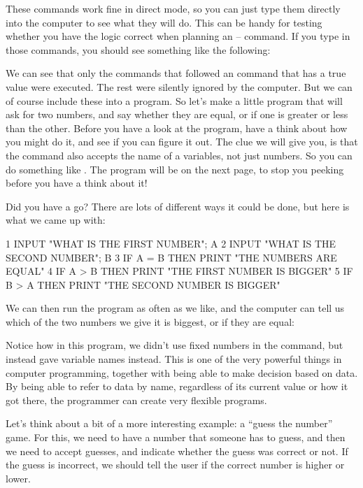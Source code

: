 \needspace{4cm}
These commands work fine in direct mode, so you can just type them
directly into the computer to see what they will do.  This can be
handy for testing whether you have the logic correct when planning an
 --  command.  If you type in those commands, you
should see something like the following:


We can see that only the  commands that followed an
 command that has a true value were executed. The rest
were silently ignored by the computer.  But we can of course include
these into a program. So let's make a little program that will ask
for two numbers, and say whether they are equal, or if one is greater
or less than the other.  Before you have a look at the program, have
a think about how you might do it, and see if you can figure it out.
The clue we will give you, is that the  command also accepts the name of
a variables, not just numbers. So you can do something like . The program will be on the next page, to stop you peeking before you
have a think about it!

\pagebreak

Did you have a go?  There are lots of different ways it could be done,
but here is what we came up with:

\begin{screencode}
1 INPUT "WHAT IS THE FIRST NUMBER"; A
2 INPUT "WHAT IS THE SECOND NUMBER"; B
3 IF A = B THEN PRINT "THE NUMBERS ARE EQUAL"
4 IF A > B THEN PRINT "THE FIRST NUMBER IS BIGGER"
5 IF B > A THEN PRINT "THE SECOND NUMBER IS BIGGER"
\end{screencode}

We can then run the program as often as we like, and the computer
can tell us which of the two numbers we give it is biggest, or if they
are equal:


Notice how in this program, we didn't use fixed numbers in the
 command, but instead gave variable names instead.  This is
one of the very powerful things in computer programming, together
with being able to make decision based on data. By being able to refer
to data by name, regardless of its current value or how it got there,
the programmer can create very flexible programs.

Let's think about a bit of a more interesting example: a ``guess the
number'' game.
For this, we need to have a number that someone has to guess, and then
we need to accept guesses, and indicate whether the guess was correct
or not. If the guess is incorrect, we should tell the user if the
correct number is higher or lower.

